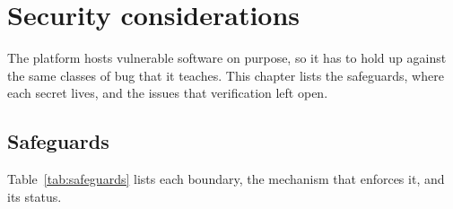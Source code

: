 \chapter{Security considerations}
\label{ch:security}

The platform hosts vulnerable software on purpose, so it has to hold up against the same classes of bug that it teaches. This chapter lists the safeguards, where each secret lives, and the issues that verification left open.

\section{Safeguards}
\label{sec:safeguards}

Table~\ref{tab:safeguards} lists each boundary, the mechanism that enforces it, and its status.

